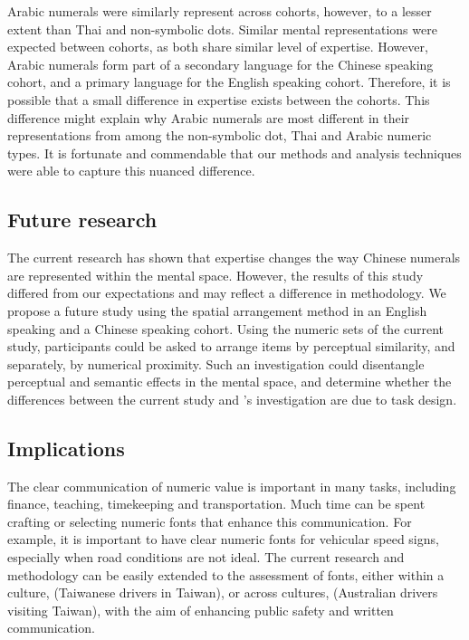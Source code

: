Arabic numerals were similarly represent across cohorts, however, to a lesser extent than Thai and non-symbolic dots. Similar mental representations were expected between cohorts, as both share similar level of expertise. However, Arabic numerals form part of a secondary language for the Chinese speaking cohort, and a primary language for the English speaking cohort. Therefore, it is possible that a small difference in expertise exists between the cohorts. This difference might explain why Arabic numerals are most different in their representations from among the non-symbolic dot, Thai and Arabic numeric types. It is fortunate and commendable that our methods and analysis techniques were able to capture this nuanced difference. 


\subsection{Future research}
The current research has shown that expertise changes the way Chinese numerals are represented within the mental space. However, the results of this study differed from our expectations \cite{yeh2003role} and may reflect a difference in methodology. We propose a future study using the spatial arrangement method \cite<as used by>{yeh2003role} in an English speaking and a Chinese speaking cohort. Using the numeric sets of the current study, participants could be asked to arrange items by perceptual similarity, and separately, by numerical proximity. Such an investigation could disentangle perceptual and semantic effects in the mental space, and determine whether the differences between the current study and \citeauthor{yeh2003role}'s investigation are due to task design. 


\subsection{Implications}
The clear communication of numeric value is important in many tasks, including finance, teaching, timekeeping and transportation. Much time can be spent crafting or selecting numeric fonts that enhance this communication. For example, it is important to have clear numeric fonts for vehicular speed signs, especially when road conditions are not ideal. The current research and methodology can be easily extended to the assessment of fonts, either within a culture, (\eg Taiwanese drivers in Taiwan), or across cultures, (\eg Australian drivers visiting Taiwan), with the aim of enhancing public safety and written communication. 

